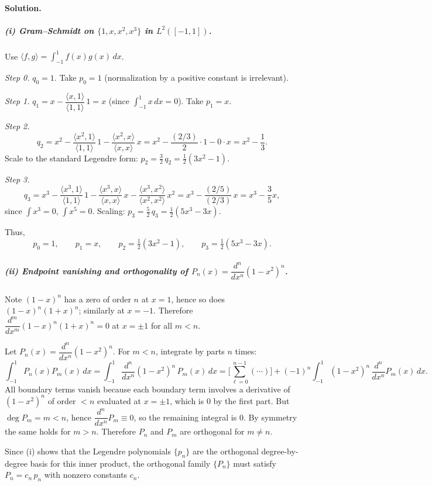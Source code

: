 \documentclass[12pt,a4paper]{article}
\theoremstyle{plain}
\theoremstyle{definition}
\theoremstyle{remark}
\theoremstyle{remark}
\begin{document}
\paragraph{Solution.}

\subparagraph*{(i) Gram--Schmidt on $\{1,x,x^2,x^3\}$ in $L^2([-1,1])$.}
Use $\langle f,g\rangle=\int_{-1}^1 f(x)g(x)\,dx$.

\emph{Step 0.} $q_0=1$. Take $p_0=1$ (normalization by a positive constant is irrelevant).

\emph{Step 1.} $q_1=x-\dfrac{\langle x,1\rangle}{\langle 1,1\rangle}\,1=x$ (since $\int_{-1}^1 x\,dx=0$). Take $p_1=x$.

\emph{Step 2.} 
\[
q_2=x^2-\frac{\langle x^2,1\rangle}{\langle 1,1\rangle}\,1
-\frac{\langle x^2,x\rangle}{\langle x,x\rangle}\,x
= x^2-\frac{(2/3)}{2}\cdot 1-0\cdot x
= x^2-\frac{1}{3}.
\]
Scale to the standard Legendre form: $p_2=\frac{3}{2}\,q_2=\frac{1}{2}(3x^2-1)$.

\emph{Step 3.}
\[
q_3=x^3-\frac{\langle x^3,1\rangle}{\langle 1,1\rangle}\,1
-\frac{\langle x^3,x\rangle}{\langle x,x\rangle}\,x
-\frac{\langle x^3,x^2\rangle}{\langle x^2,x^2\rangle}\,x^2
= x^3-\frac{(2/5)}{(2/3)}\,x
= x^3-\frac{3}{5}x,
\]
since $\int x^3=0$, $\int x^5=0$. Scaling: $p_3=\frac{5}{2}\,q_3=\frac{1}{2}(5x^3-3x)$.

Thus,
\[
p_0=1,\qquad p_1=x,\qquad p_2=\tfrac{1}{2}(3x^2-1),\qquad p_3=\tfrac{1}{2}(5x^3-3x).
\]

\subparagraph*{(ii) Endpoint vanishing and orthogonality of $P_n(x)=\dfrac{d^n}{dx^n}(1-x^2)^n$.}
Note $(1-x)^n$ has a zero of order $n$ at $x=1$, hence so does $(1-x)^n(1+x)^n$; similarly at $x=-1$.
Therefore $\dfrac{d^m}{dx^m}(1-x)^n(1+x)^n=0$ at $x=\pm1$ for all $m<n$.

Let $P_n(x)=\dfrac{d^n}{dx^n}(1-x^2)^n$. For $m<n$,
integrate by parts $n$ times:
\[
\int_{-1}^1 P_n(x)P_m(x)\,dx
=\int_{-1}^1 \frac{d^n}{dx^n}(1-x^2)^n\,P_m(x)\,dx
=\Big[ \sum_{\ell=0}^{n-1}(\cdots)\Big] + (-1)^n \int_{-1}^1 (1-x^2)^n\,\frac{d^n}{dx^n}P_m(x)\,dx.
\]
All boundary terms vanish because each boundary term involves a derivative of $(1-x^2)^n$ of order $<n$ evaluated at $x=\pm1$, which is $0$ by the first part.
But $\deg P_m=m<n$, hence $\dfrac{d^n}{dx^n}P_m\equiv0$, so the remaining integral is $0$.
By symmetry the same holds for $m>n$. Therefore $P_n$ and $P_m$ are orthogonal for $m\ne n$.

Since (i) shows that the Legendre polynomials $\{p_n\}$ are the orthogonal degree-by-degree basis for this inner product, the orthogonal family $\{P_n\}$ must satisfy $P_n=c_n\,p_n$ with nonzero constants $c_n$.
\end{document}
